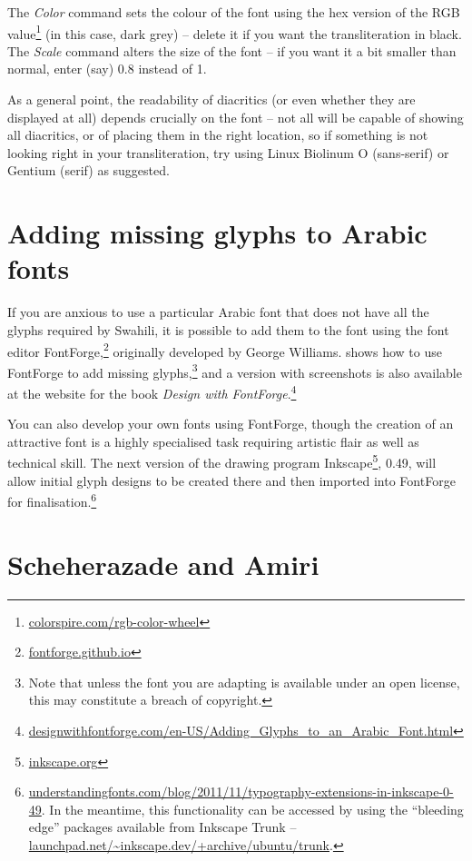 The \textit{Color} command sets the colour of the font using the hex version of the RGB value\footnote{\url{colorspire.com/rgb-color-wheel}} (in this case, dark grey) -- delete it if you want the transliteration in black.  The \textit{Scale} command alters the size of the font -- if you want it a bit smaller than normal, enter (say) 0.8 instead of 1.

As a general point, the readability of diacritics (or even whether they are displayed at all) depends crucially on the font -- not all will be capable of showing all diacritics, or of placing them in the right location, so if something is not looking right in your transliteration, try using Linux Biolinum O (sans-serif) or Gentium (serif) as suggested. 

\section{Adding missing glyphs to Arabic fonts}

If you are anxious to use a particular Arabic font that does not have all the glyphs required by Swahili, it is possible to add them to the font using the font editor FontForge,\footnote{\url{fontforge.github.io}} originally developed by George Williams.   shows how to use FontForge to add missing glyphs,\footnote{Note that unless the font you are adapting is available under an open license, this may constitute a breach of copyright.} and a version with screenshots is also available at the website for the book \textit{Design with FontForge}.\footnote{\url{designwithfontforge.com/en-US/Adding_Glyphs_to_an_Arabic_Font.html}}

You can also develop your own fonts using FontForge, though the creation of an attractive font is a highly specialised task requiring artistic flair as well as technical skill.   The next version of the drawing program Inkscape\footnote{\url{inkscape.org}}, 0.49, will allow initial glyph designs to be created there and then imported into FontForge for finalisation.\footnote{\url{understandingfonts.com/blog/2011/11/typography-extensions-in-inkscape-0-49}.  In the meantime, this functionality can be accessed by using the ``bleeding edge'' packages available from Inkscape Trunk -- \url{launchpad.net/~inkscape.dev/+archive/ubuntu/trunk}.}

\section{Scheherazade and Amiri}
\label{s:sham}

